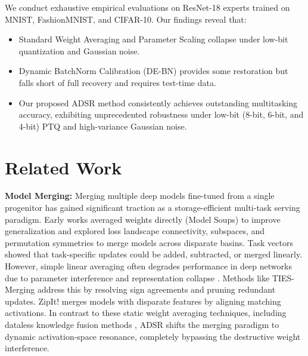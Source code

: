\documentclass{article}
\theoremstyle{plain}
\theoremstyle{definition}
\theoremstyle{remark}
\begin{document}
We conduct exhaustive empirical evaluations on ResNet-18 experts trained on MNIST, FashionMNIST, and CIFAR-10. Our findings reveal that:
\begin{itemize}
    \item Standard Weight Averaging and Parameter Scaling collapse under low-bit quantization and Gaussian noise.
    \item Dynamic BatchNorm Calibration (DE-BN) provides some restoration but falls short of full recovery and requires test-time data.
    \item Our proposed ADSR method consistently achieves outstanding multitasking accuracy, exhibiting unprecedented robustness under low-bit (8-bit, 6-bit, and 4-bit) PTQ and high-variance Gaussian noise.
\end{itemize}

\section{Related Work}
\label{sec:related_work}

\textbf{Model Merging:} Merging multiple deep models fine-tuned from a single progenitor has gained significant traction as a storage-efficient multi-task serving paradigm. Early works averaged weights directly (Model Soups) to improve generalization \cite{wortsman22model} and explored loss landscape connectivity, subspaces, and permutation symmetries \cite{ainsworth22git, entezari21permutation, wortsman21learning} to merge models across disparate basins. Task vectors \cite{ilharco22editing} showed that task-specific updates could be added, subtracted, or merged linearly. However, simple linear averaging often degrades performance in deep networks due to parameter interference and representation collapse \cite{choshen23fusing, matena22merging}. Methods like TIES-Merging \cite{yadav23ties} address this by resolving sign agreements and pruning redundant updates. ZipIt! \cite{stoica23zipit} merges models with disparate features by aligning matching activations. In contrast to these static weight averaging techniques, including dataless knowledge fusion methods \cite{jin23dataless}, ADSR shifts the merging paradigm to dynamic activation-space resonance, completely bypassing the destructive weight interference.
\end{document}
